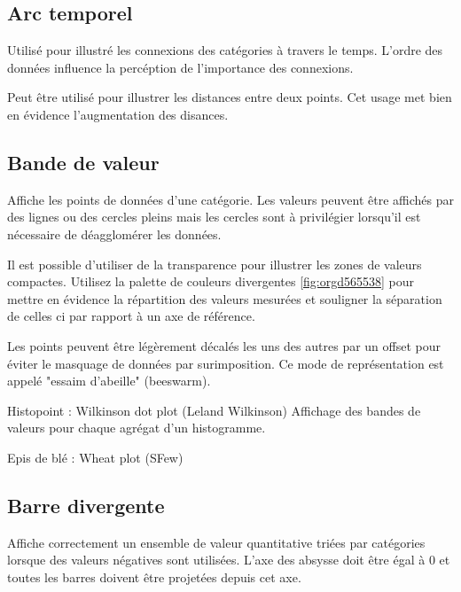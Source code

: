 \documentclass[a4paper,12pt]{article}
\begin{document}
\begin{multicols}{2}
\subsection*{Arc temporel}
\label{sec:org2879fd7}
Utilisé pour illustré les connexions des catégories à travers le temps. L'ordre des données influence la percéption de l'importance des connexions. \autocite{jonathanschwabishRelationship2021}

Peut être utilisé pour illustrer les distances entre deux points. Cet usage met bien en évidence l'augmentation des disances. \autocite{jonathanschwabishRelationship2021}
\subsection*{Bande de valeur}
\label{sec:org5c08acc}
Affiche les points de données d'une catégorie.\autocite{jonathanschwabishDistribution2021} Les valeurs peuvent être affichés par des lignes ou des cercles pleins mais les cercles sont à privilégier lorsqu'il est nécessaire de déagglomérer les données.

Il est possible d'utiliser de la transparence pour illustrer les zones de valeurs compactes. \autocite{jonathanschwabishDistribution2021} Utilisez la palette de couleurs divergentes \ref{fig:orgd565538} pour mettre en évidence la répartition des valeurs mesurées et souligner la séparation de celles ci par rapport à un axe de référence.\autocite{jonathanschwabishDistribution2021}

Les points peuvent être légèrement décalés les uns des autres par un offset pour éviter le masquage de données par surimposition. Ce mode de représentation est appelé "essaim d'abeille" (beeswarm). \autocite{jonathanschwabishDistribution2021}

Histopoint : Wilkinson dot plot (Leland Wilkinson) Affichage des bandes de valeurs pour chaque agrégat d'un histogramme.\autocite{jonathanschwabishDistribution2021}

Epis de blé : Wheat plot (SFew)
\subsection*{Barre divergente}
\label{sec:orgf01621c}
Affiche correctement un ensemble de valeur quantitative triées par catégories lorsque des valeurs négatives sont utilisées. \autocite{alansmithLexiqueVisuel} L'axe des absysse doit être égal à 0 et toutes les barres doivent être projetées depuis cet axe.

\end{multicols}
\end{document}
